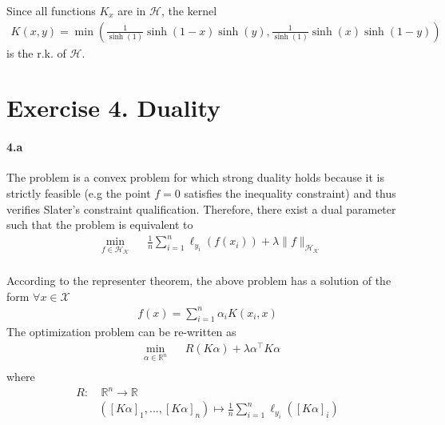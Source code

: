 \documentclass[10pt]{article}
\begin{document}
    Since all functions $K_x$ are in $\mathcal{H}$, the kernel 
    \begin{align*}
        K(x, y) = \min\left(\frac{1}{\sinh(1)}\sinh(1-x)\sinh(y), 
        \frac{1}{\sinh(1)}\sinh(x)\sinh(1 - y)\right) 
    \end{align*}
    is the r.k. of $\mathcal{H}$.
    \section*{Exercise 4. Duality}
    \paragraph{4.a} The problem is a convex problem for which strong duality 
    holds because it is strictly feasible (e.g the point $f=0$ satisfies the
    inequality constraint) and thus verifies Slater’s constraint qualification. 
    Therefore, there exist a dual parameter such that the problem is equivalent 
    to 
    \begin{equation*}
        \begin{aligned}
        & \underset{f\in\mathcal{H}_\mathcal{K}}{\text{min}}
        & & \frac{1}{n}\sum_{i=1}^n \ell_{y_i}(f(x_i)) + \lambda \lVert f
        \rVert_{\mathcal{H}_\mathcal{K}}\\
        \end{aligned}
    \end{equation*}

    According to the representer theorem, the above problem has a solution of
    the form $\forall x\in \mathcal{X}$
    \begin{align*}
        f(x) = \sum_{i=1}^n \alpha_i K(x_i, x)
    \end{align*}
    The optimization problem can be re-written as 
    \begin{equation*}
        \begin{aligned}
        & \underset{\alpha\in\mathbb{R}^n}{\text{min}}
        & & R(K\alpha) + \lambda \alpha^\top K \alpha\\
        \end{aligned}
    \end{equation*} 
    where 
    \begin{align*}
        R:& \ \mathbb{R}^n \rightarrow \mathbb{R}\\
        & ([K\alpha]_1, ..., [K\alpha]_n) \mapsto \frac{1}{n}\sum_{i=1}^n
        \ell_{y_i}([K\alpha]_i)
    \end{align*}
\end{document}

